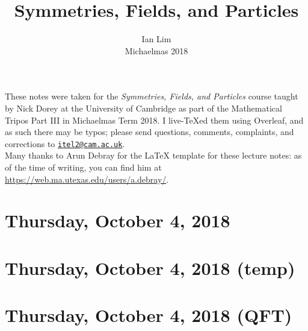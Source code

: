\documentclass[reqno]{amsart}
\begin{document}
\title{Symmetries, Fields, and Particles}
\author{Ian Lim\\ Michaelmas 2018}
\maketitle
{\small\noindent These notes were taken for the \textit{Symmetries, Fields, and Particles} course taught by Nick Dorey at the University of Cambridge as part of the Mathematical Tripos Part III in Michaelmas Term 2018. I live-\TeX ed them using Overleaf, and as such there may be typos; please send questions, comments, complaints, and corrections to 
\href{mailto:itel2@cam.ac.uk?subject=SFP\%20Lecture\%20Notes}{\texttt{itel2@cam.ac.uk}}.\\
Many thanks to Arun Debray for the {\LaTeX} template for these lecture notes: as of the time of writing, you can find him at \url{https://web.ma.utexas.edu/users/a.debray/}.}%

\tableofcontents

\section{Thursday, October 4, 2018}
	
	
\section{Thursday, October 4, 2018 (temp)}
	
	
\section{Thursday, October 4, 2018 (QFT)}
	
\end{document}
